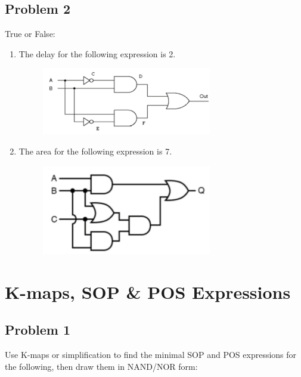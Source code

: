 \documentclass{article}
\begin{document}
\subsection*{Problem 2}
True or False:
\begin{enumerate}[label=\alph*.]
    \item The delay for the following expression is 2.

    \begin{figure}[!h]
        \centering
        \includegraphics[width=0.7\textwidth]{figures/boolean2a.png}
    \end{figure}
    
    \item The area for the following expression is 7.

    \begin{figure}[!h]
        \centering
        \includegraphics[width=0.7\textwidth]{figures/boolean2b.png}
    \end{figure}
    
\end{enumerate}

\newpage
\section*{K-maps, SOP \& POS Expressions}
\subsection*{Problem 1}
Use K-maps or simplification to find the minimal SOP and POS expressions for the following, then draw them in NAND/NOR form:\\
\end{document}
